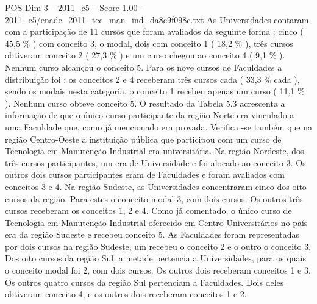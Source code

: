 \begin{textsample}{POS Dim 3 – 2011\_c5 – Score 1.00 – 2011\_c5/enade\_2011\_tec\_man\_ind\_da8c9f098c.txt}
As Universidades contaram com a participação de 11 cursos que foram avaliados da seguinte forma : cinco ( 45,5 \% ) com conceito 3, o modal, dois com conceito 1 ( 18,2 \% ), três cursos obtiveram conceito 2 ( 27,3 \% ) e um curso chegou ao conceito 4 ( 9,1 \% ).
Nenhum curso alcançou o conceito 5.
Para os nove cursos de Faculdades a distribuição foi : os conceitos 2 e 4 receberam três cursos cada ( 33,3 \% cada ), sendo os modais nesta categoria, o conceito 1 recebeu apenas um curso ( 11,1 \% ).
Nenhum curso obteve conceito 5.
O resultado da Tabela 5.3 acrescenta a informação de que o único curso participante da região Norte era vinculado a uma Faculdade que, como já mencionado era provada.
Verifica -se também que na região Centro-Oeste a instituição pública que participou com um curso de Tecnologia em Manutenção Industrial era universitária.
Na região Nordeste, dos três cursos participantes, um era de Universidade e foi alocado ao conceito 3.
Os outros dois cursos participantes eram de Faculdades e foram avaliados com conceitos 3 e 4.
Na região Sudeste, as Universidades concentraram cinco dos oito cursos da região.
Para estes o conceito modal 3, com dois cursos.
Os outros três cursos receberam os conceitos 1, 2 e 4.
Como já comentado, o único curso de Tecnologia em Manutenção Industrial oferecido em Centro Universitários no país era da região Sudeste e recebeu conceito 5.
As Faculdades foram representadas por dois cursos na região Sudeste, um recebeu o conceito 2 e o outro o conceito 3.
Dos oito cursos da região Sul, a metade pertencia a Universidades, para os quais o conceito modal foi 2, com dois cursos.
Os outros dois receberam conceitos 1 e 3.
Os outros quatro cursos da região Sul pertenciam a Faculdades.
Dois deles obtiveram conceito 4, e os outros dois receberam conceitos 1 e 2.

\end{textsample}
